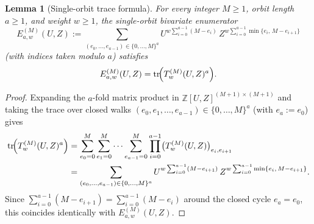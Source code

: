 \documentclass[preprint,12pt]{elsarticle}
\newcommand{\Z}{\mathbb Z}
\newcommand{\tr}{\operatorname{tr}}
\numberwithin{equation}{section}
\theoremstyle{plain}
\newtheorem{lemma}[theorem]{Lemma}
\theoremstyle{definition}
\theoremstyle{remark}
\begin{document}
\begin{lemma}[Single-orbit trace formula]\label{lem:orbit-trace}
For every integer $M\ge 1$, orbit length $a\ge 1$, and weight $w\ge 1$, the
single-orbit bivariate enumerator
\[
E_{a,w}^{(M)}(U,Z):=
 \sum_{(e_0,\dots,e_{a-1})\in\{0,\dots,M\}^a}
   U^{w\sum_{i=0}^{a-1}(M-e_i)}\,
   Z^{w\sum_{i=0}^{a-1}\min\{e_i,\,M-e_{i+1}\}}
\]
(with indices taken modulo $a$) satisfies
\begin{equation}\label{eq:orbit-trace}
E_{a,w}^{(M)}(U,Z)=\tr\!\Bigl(T_w^{(M)}(U,Z)^a\Bigr).
\end{equation}
\end{lemma}

\begin{proof}
Expanding the $a$-fold matrix product in $\Z[U,Z]^{(M+1)\times(M+1)}$ and taking
the trace over closed walks $(e_0,e_1,\dots,e_{a-1})\in\{0,\dots,M\}^a$ (with
$e_a:=e_0$) gives
\begin{align*}
\tr\!\Bigl(T_w^{(M)}(U,Z)^a\Bigr)
 &=\sum_{e_0=0}^{M}\sum_{e_1=0}^{M}\cdots\sum_{e_{a-1}=0}^{M}
    \prod_{i=0}^{a-1}\bigl(T_w^{(M)}(U,Z)\bigr)_{e_i,e_{i+1}} \\
 &=\sum_{(e_0,\dots,e_{a-1})\in\{0,\dots,M\}^a}
    U^{w\sum_{i=0}^{a-1}(M-e_{i+1})}\,
    Z^{w\sum_{i=0}^{a-1}\min\{e_i,\,M-e_{i+1}\}}.
\end{align*}
Since $\sum_{i=0}^{a-1}(M-e_{i+1})=\sum_{i=0}^{a-1}(M-e_i)$ around the closed
cycle $e_a=e_0$, this coincides identically with $E_{a,w}^{(M)}(U,Z)$.
\end{proof}
\end{document}
